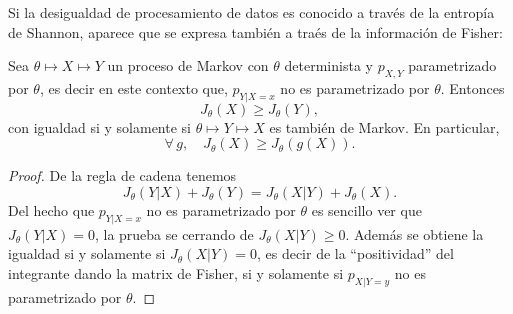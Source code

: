 
\label{Ssec:SZ:ProcDatosFisher}

Si  la desigualdad  de  procesamiento de  datos  es conocido  a  trav\'es de  la
entrop\'ia  de  Shannon, aparece  que  se  expresa  tambi\'en  a tra\'es  de  la
informaci\'on de Fisher:

\begin{teorema}
\label{Teo:SZ:DesigualdadProcesamientoDatosFisher}
%
  Sea  $\theta  \mapsto  X  \mapsto   Y$  un  proceso  de  Markov  con  $\theta$
  determinista y $p_{X,Y}$ parametrizado por $\theta$, es decir en este contexto
  que, $p_{Y|X=x}$ no es parametrizado por $\theta$. Entonces
  \[
  J_\theta(X) \ge J_\theta(Y),
  \]
  con igualdad si y solamente si $\theta \mapsto Y \mapsto X$ es tambi\'en
  de Markov. En  particular,
  \[
  \forall \, g, \quad J_\theta(X) \ge J_\theta(g(X)).
  \]
\end{teorema}
%
\begin{proof}
  De la regla de cadena tenemos
  \[
  J_\theta(Y|X) + J_\theta(Y) = J_\theta(X|Y) + J_\theta(X).
  \]
  Del hecho que $p_{Y|X=x}$ no es parametrizado por $\theta$ es sencillo ver que
  $J_\theta(Y|X) = 0$, la prueba  se cerrando de $J_\theta(X|Y) \ge 0$. Adem\'as
  se obtiene la igualdad  si y solamente si $J_\theta(X|Y) = 0$,  es decir de la
  ``positividad'' del  integrante dando la matrix  de Fisher, si  y solamente si
  $p_{X|Y=y}$ no es parametrizado por $\theta$.
\end{proof}




\label{Ssec:SZ:EPI}

